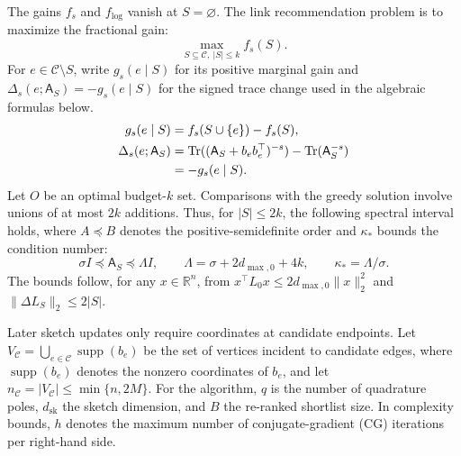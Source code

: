 \documentclass[conference]{IEEEtran}
\theoremstyle{definition}
\DeclareMathOperator{\Tr}{Tr}
\newcommand{\dsk}{d_{\mathrm{sk}}}
\newcommand{\matA}{\mathsf A}
\begin{document}
The gains $f_s$ and $f_{\log}$ vanish at $S=\varnothing$. The link
recommendation problem is to maximize the fractional gain:
\begin{equation}
\max_{S\subseteq\mathcal C,\ |S|\le k} f_s(S).
\label{eq:problem}
\end{equation}
For $e\in\mathcal C\setminus S$, write $g_s(e\mid S)$ for
its positive marginal gain and $\Delta_s(e;\matA_S)=-g_s(e\mid S)$
for the signed trace change used in the algebraic formulas below.
\begin{align}
g_s(e\mid S)&=f_s(S\cup\{e\})-f_s(S),\\
\Delta_s(e;\matA_S)&=\Tr((\matA_S+b_eb_e^\top)^{-s})-\Tr(\matA_S^{-s})\notag\\
&=-g_s(e\mid S).
\end{align}
Let $O$ be an optimal budget-$k$ set. Comparisons with the greedy
solution involve unions of at most $2k$ additions. Thus, for
$|S|\le2k$, the following spectral interval holds, where
$A\preceq B$ denotes the positive-semidefinite order and
$\kappa_*$ bounds the condition number:
\begin{equation}
\sigma I\preceq \matA_S\preceq\Lambda I,\qquad
\Lambda=\sigma+2d_{\max,0}+4k,\qquad
\kappa_*=\Lambda/\sigma.
\label{eq:spectral-window}
\end{equation}
The bounds follow, for any $x\in\mathbb R^n$, from
$x^\top L_0x\le2d_{\max,0}\|x\|_2^2$ and
$\|\Delta L_S\|_2\le2|S|$.

Later sketch updates only require coordinates at candidate endpoints.
Let $V_{\mathcal C}=\bigcup_{e\in\mathcal C}\operatorname{supp}(b_e)$
be the set of vertices incident to candidate edges, where
$\operatorname{supp}(b_e)$ denotes the nonzero coordinates of $b_e$,
and let $n_{\mathcal C}=|V_{\mathcal C}|\le\min\{n,2M\}$.
For the algorithm, $q$ is the number of quadrature poles,
$\dsk$ the sketch dimension, and $B$ the re-ranked shortlist
size. In complexity bounds, $h$ denotes the maximum number
of conjugate-gradient (CG) iterations per right-hand side.
\end{document}
